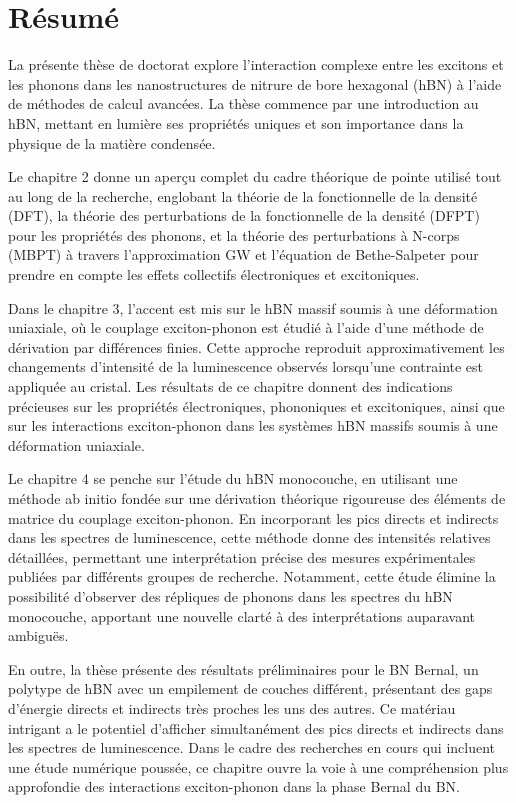\chapter*{Résumé}

%

%

La présente thèse de doctorat explore l'interaction complexe entre les excitons et les phonons dans les nanostructures de nitrure de bore hexagonal (hBN) à l'aide de méthodes de calcul avancées. La thèse commence par une introduction au hBN, mettant en lumière ses propriétés uniques et son importance dans la physique de la matière condensée. 

Le chapitre 2 donne un aperçu complet du cadre théorique de pointe utilisé tout au long de la recherche, englobant la théorie de la fonctionnelle de la densité (DFT), la théorie des perturbations de la fonctionnelle de la densité (DFPT) pour les propriétés des phonons, et la théorie des perturbations à N-corps (MBPT) à travers l'approximation GW et l'équation de Bethe-Salpeter pour prendre en compte les effets collectifs électroniques et excitoniques.

Dans le chapitre 3, l'accent est mis sur le hBN massif soumis à une déformation uniaxiale, où le couplage exciton-phonon est étudié à l'aide d'une méthode de dérivation par différences finies. Cette approche reproduit approximativement les changements d'intensité de la luminescence observés lorsqu'une contrainte est appliquée au cristal. Les résultats de ce chapitre donnent des indications précieuses sur les propriétés électroniques, phononiques et excitoniques, ainsi que sur les interactions exciton-phonon dans les systèmes hBN massifs soumis à une déformation uniaxiale.

Le chapitre 4 se penche sur l'étude du hBN monocouche, en utilisant une méthode ab initio fondée sur une dérivation théorique rigoureuse des éléments de matrice du couplage exciton-phonon. En incorporant les pics directs et indirects dans les spectres de luminescence, cette méthode donne des intensités relatives détaillées, permettant une interprétation précise des mesures expérimentales publiées par différents groupes de recherche. Notamment, cette étude élimine la possibilité d'observer des répliques de phonons dans les spectres du hBN monocouche, apportant une nouvelle clarté à des interprétations auparavant ambiguës.

En outre, la thèse présente des résultats préliminaires pour le BN Bernal, un polytype de hBN avec un empilement de couches différent, présentant des gaps d'énergie directs et indirects très proches les uns des autres. Ce matériau intrigant a le potentiel d'afficher simultanément des pics directs et indirects dans les spectres de luminescence. Dans le cadre des recherches en cours qui incluent une étude numérique poussée, ce chapitre ouvre la voie à une compréhension plus approfondie des interactions exciton-phonon dans la phase Bernal du BN.


